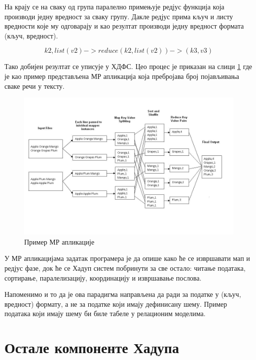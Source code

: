 \documentclass[12pt,oneside]{memoir}
\begin{document}
На крају се на сваку од група паралелно примењује редјус функција која производи једну вредност за сваку групу. Дакле редјус прима кључ и листу вредности које му одговарају и као резултат производи једну вредност формата (кључ, вредност). \cite{hadoop_learning}

$$ k2, list(v2) -> reduce(k2, list(v2)) -> (k3, v3) $$

Тако добијен резултат се уписује у ХДФС. Цео процес је приказан на слици \ref{fig:map_reduce} где је као пример представљена МР апликација која пребројава број појављивања сваке речи у тексту. \cite{hadoop_learning}

\begin{figure}[!ht]
  \centering
  \includegraphics[width=1\textwidth]{pictures/mapreduce_step2.jpg}
  \caption{Пример МР апликације}
  \label{fig:map_reduce}
\end{figure}

У МР апликацијама задатак програмера је да опише како ће се извршавати мап и редјус фазе, док ће се Хадуп систем побринути за све остало: читање података, сортирање, паралелизацију, координацију и извршавање послова. \cite{hadoop_beginner}

Напоменимо и то да је ова парадигма направљена да ради за податке у (кључ, вредност) формату, а не за податке који имају дефинисану шему. Пример података који имају шему би биле табеле у релационим моделима. \cite{hadoop_beginner}


\section{Остале компоненте Хадупа}
\label{sec:ostale_komp_hadupa}
\end{document}
